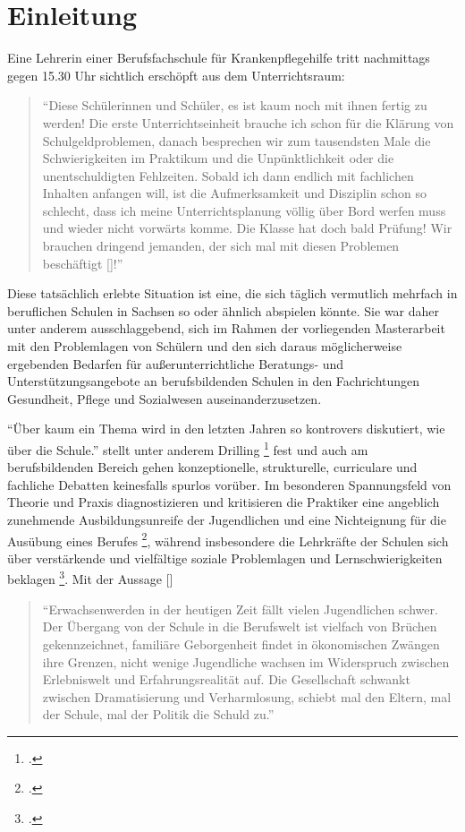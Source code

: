 \section{Einleitung}
\label{sec:Einleitung}

Eine Lehrerin einer Berufsfachschule für Krankenpflegehilfe tritt nachmittags gegen 15.30 Uhr sichtlich erschöpft aus dem Unterrichtsraum:
\begin{quotation}
\noindent
"`Diese Schülerinnen und Schüler, es ist kaum noch mit ihnen fertig zu werden! Die erste Unterrichtseinheit brauche ich schon für die Klärung von Schulgeldproblemen, danach besprechen wir zum tausendsten Male die Schwierigkeiten im Praktikum und die Unpünktlichkeit oder die unentschuldigten Fehlzeiten. Sobald ich dann endlich mit fachlichen Inhalten anfangen will, ist die Aufmerksamkeit und Disziplin schon so schlecht, dass ich meine Unterrichtsplanung völlig über Bord werfen muss und wieder nicht vorwärts komme. Die Klasse hat doch bald Prüfung! Wir brauchen dringend jemanden, der sich mal mit diesen Problemen beschäftigt [\punkte]!"'
\end{quotation}

\noindent
Diese tatsächlich erlebte Situation ist eine, die sich täglich vermutlich mehrfach in beruflichen Schulen in Sachsen so oder ähnlich abspielen könnte. Sie war daher unter anderem ausschlaggebend, sich im Rahmen der vorliegenden Masterarbeit mit den Problemlagen von Schülern und den sich daraus möglicherweise ergebenden Bedarfen für außerunterrichtliche Beratungs- und Unterstützungsangebote an berufsbildenden Schulen in den Fachrichtungen Gesundheit, Pflege und Sozialwesen auseinanderzusetzen. 

"`Über kaum ein Thema wird in den letzten Jahren so kontrovers diskutiert, wie über die Schule."' stellt unter anderem Drilling \footcite[9]{Drilling2004} fest und auch am berufsbildenden Bereich gehen konzeptionelle, strukturelle, curriculare und fachliche Debatten keinesfalls spurlos vorüber. Im besonderen Spannungsfeld von Theorie und Praxis diagnostizieren und kritisieren die Praktiker eine angeblich zunehmende Ausbildungsunreife der Jugendlichen und eine Nichteignung für die Ausübung eines Berufes \footcite[vgl.]{Ehrenthal2005}, während insbesondere die Lehrkräfte der Schulen sich über verstärkende und vielfältige soziale Problemlagen und Lernschwierigkeiten beklagen \footcite[vgl.][13]{SMSSS2009}. Mit der Aussage [\punkte]

\begin{quotation}
\noindent
"`Erwachsenwerden in der heutigen Zeit fällt vielen Jugendlichen schwer. Der Übergang von der Schule in die Berufswelt ist vielfach von Brüchen gekennzeichnet, familiäre Geborgenheit findet in ökonomischen Zwängen ihre Grenzen, nicht wenige Jugendliche wachsen im Widerspruch zwischen Erlebniswelt und Erfahrungsrealität auf. Die Gesellschaft schwankt zwischen Dramatisierung und Verharmlosung, schiebt mal den Eltern, mal der Schule, mal der Politik die Schuld zu."' 
\end{quotation}

